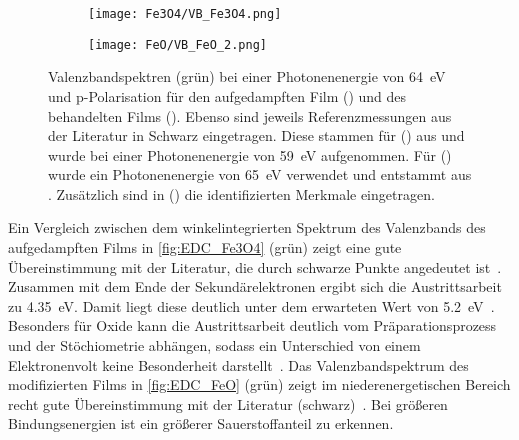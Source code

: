         \begin{figure}
            \begin{subfigure}[t]{0.48\textwidth}
                \centering
                \texttt{[image: Fe3O4/VB\_Fe3O4.png]}
                \subcaption{}
                \label{fig:EDC_Fe3O4}
            \end{subfigure}
            \begin{subfigure}[t]{0.48\textwidth}
                \centering
                \texttt{[image: FeO/VB\_FeO\_2.png]}
                \subcaption{}
                \label{fig:EDC_FeO}
            \end{subfigure}
            \caption{Valenzbandspektren (grün) bei einer Photonenenergie von \SI{64}{\electronvolt} und p-Polarisation für den aufgedampften Film () und des behandelten Films ().
            Ebenso sind jeweils Referenzmessungen aus der Literatur in Schwarz eingetragen.
            Diese stammen für () aus \cite{FeO_35} und wurde bei einer Photonenenergie von \SI{59}{\electronvolt} aufgenommen.
            Für () wurde ein Photonenenergie von \SI{65}{\electronvolt} verwendet und entstammt aus \cite{FeO_14}.
            Zusätzlich sind in () die identifizierten Merkmale eingetragen.}
            \label{fig:EDCs}
        \end{figure}
        Ein Vergleich zwischen dem winkelintegrierten Spektrum des Valenzbands des aufgedampften Films in \autoref{fig:EDC_Fe3O4} (grün) zeigt eine gute Übereinstimmung mit der Literatur, die durch schwarze Punkte angedeutet ist~\cite{FeO_35}.
        Zusammen mit dem Ende der Sekundärelektronen ergibt sich die Austrittsarbeit zu \SI{4.35}{\electronvolt}.
        Damit liegt diese deutlich unter dem erwarteten Wert von \SI{5.2}{\electronvolt}~\cite{FeO_40}.
        Besonders für Oxide kann die Austrittsarbeit deutlich vom Präparationsprozess und der Stöchiometrie abhängen, sodass ein Unterschied von einem Elektronenvolt keine Besonderheit darstellt~\cite{IF_11}.
        Das Valenzbandspektrum des modifizierten Films in \autoref{fig:EDC_FeO} (grün) zeigt im niederenergetischen Bereich recht gute Übereinstimmung mit der Literatur (schwarz)~\cite{FeO_14}.
        Bei größeren Bindungsenergien ist ein größerer Sauerstoffanteil zu erkennen.
